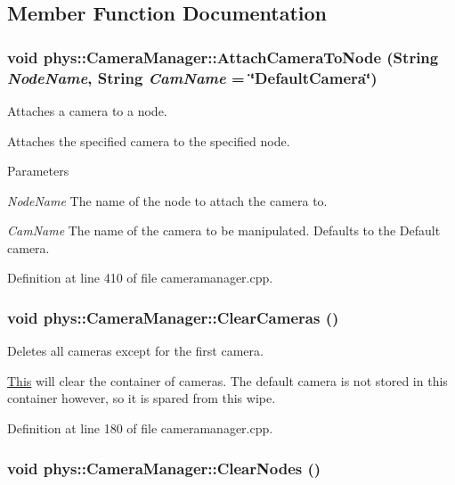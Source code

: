 \subsection{Member Function Documentation}
\hypertarget{classphys_1_1CameraManager_a1cde365b6cab80a33ddf7046489f7af9}{
\subsubsection[{AttachCameraToNode}]{\setlength{\rightskip}{0pt plus 5cm}void phys::CameraManager::AttachCameraToNode ({\bf String} {\em NodeName}, \/  {\bf String} {\em CamName} = {\ttfamily \char`\"{}DefaultCamera\char`\"{}})}}
\label{d9/d91/classphys_1_1CameraManager_a1cde365b6cab80a33ddf7046489f7af9}


Attaches a camera to a node. 

Attaches the specified camera to the specified node. 
\begin{DoxyParams}{Parameters}
\item[{\em NodeName}]The name of the node to attach the camera to. \item[{\em CamName}]The name of the camera to be manipulated. Defaults to the Default camera. \end{DoxyParams}


Definition at line 410 of file cameramanager.cpp.

\hypertarget{classphys_1_1CameraManager_a76bebee0820fcfa462412cb112b1b874}{
\subsubsection[{ClearCameras}]{\setlength{\rightskip}{0pt plus 5cm}void phys::CameraManager::ClearCameras ()}}
\label{d9/d91/classphys_1_1CameraManager_a76bebee0820fcfa462412cb112b1b874}


Deletes all cameras except for the first camera. 

\hyperlink{structThis}{This} will clear the container of cameras. The default camera is not stored in this container however, so it is spared from this wipe. 

Definition at line 180 of file cameramanager.cpp.

\hypertarget{classphys_1_1CameraManager_a42d91612bbaa00187944290d6bfd44e9}{
\subsubsection[{ClearNodes}]{\setlength{\rightskip}{0pt plus 5cm}void phys::CameraManager::ClearNodes ()}}
\label{d9/d91/classphys_1_1CameraManager_a42d91612bbaa00187944290d6bfd44e9}


